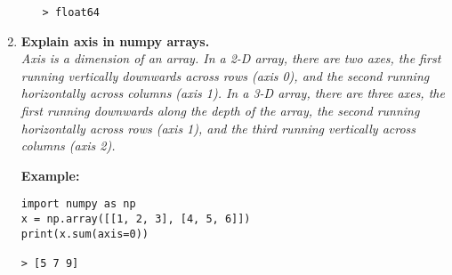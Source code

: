 \documentclass[11pt]{article}
\begin{document}
\begin{enumerate}
\begin{enumerate}
\begin{verbatim}
> float64
                \end{verbatim}

          \end{enumerate}

    \item \textbf{Explain axis in numpy arrays.}\\

          \textit{Axis is a dimension of an array. In a 2-D array, there are two axes, the first running vertically downwards across rows (axis 0), and the second running horizontally across columns (axis 1). In a 3-D array, there are three axes, the first running downwards along the depth of the array, the second running horizontally across rows (axis 1), and the third running vertically across columns (axis 2).}

          \textbf{Example:}
          \begin{verbatim}
import numpy as np
x = np.array([[1, 2, 3], [4, 5, 6]])
print(x.sum(axis=0))

> [5 7 9]
            \end{verbatim}



\end{enumerate}
\end{document}
